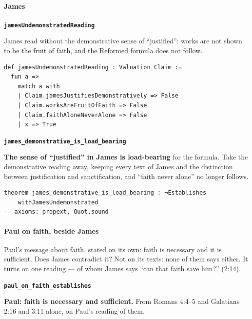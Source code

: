 \documentclass[11pt,paper=\testimonypaper,DIV=13,parskip=false]{scrartcl}
\begin{document}
\paragraph*{James}
\leavevmode\par\nobreak
\par\medskip\noindent\textbf{\texttt{james\allowbreak{}Undemonstrated\allowbreak{}Reading}}\par\nobreak\noindent
James read without the demonstrative sense of “justified”: works are not shown to be the fruit of faith, and the Reformed formula does not follow.

{\small\begin{verbatim}
def jamesUndemonstratedReading : Valuation Claim :=
  fun a =>
    match a with
    | Claim.jamesJustifiesDemonstratively => False
    | Claim.worksAreFruitOfFaith => False
    | Claim.faithAloneNeverAlone => False
    | x => True
\end{verbatim}}
\par\medskip\noindent\textbf{\texttt{james\_\allowbreak{}demonstrative\_\allowbreak{}is\_\allowbreak{}load\_\allowbreak{}bearing}}\par\nobreak\noindent
\textbf{The sense of “justified” in James is load-bearing} for the formula. Take the demonstrative reading away, keeping every text of James and the distinction between justification and sanctification, and “faith never alone” no longer follows.

{\small\begin{verbatim}
theorem james_demonstrative_is_load_bearing : ¬Establishes
    withJamesUndemonstrated
-- axioms: propext, Quot.sound
\end{verbatim}}
\paragraph*{Paul on faith, beside James}
\leavevmode\par\nobreak
Paul’s message about faith, stated on its own: faith is necessary and it is sufficient. Does James contradict it? Not on its texts: none of them says either. It turns on one reading — of whom James says “can that faith save him?” (2:14).

\par\medskip\noindent\textbf{\texttt{paul\_\allowbreak{}on\_\allowbreak{}faith\_\allowbreak{}establishes}}\par\nobreak\noindent
\textbf{Paul: faith is necessary and sufficient.} From Romans 4:4–5 and Galatians 2:16 and 3:11 alone, on Paul’s reading of them.
\end{document}
